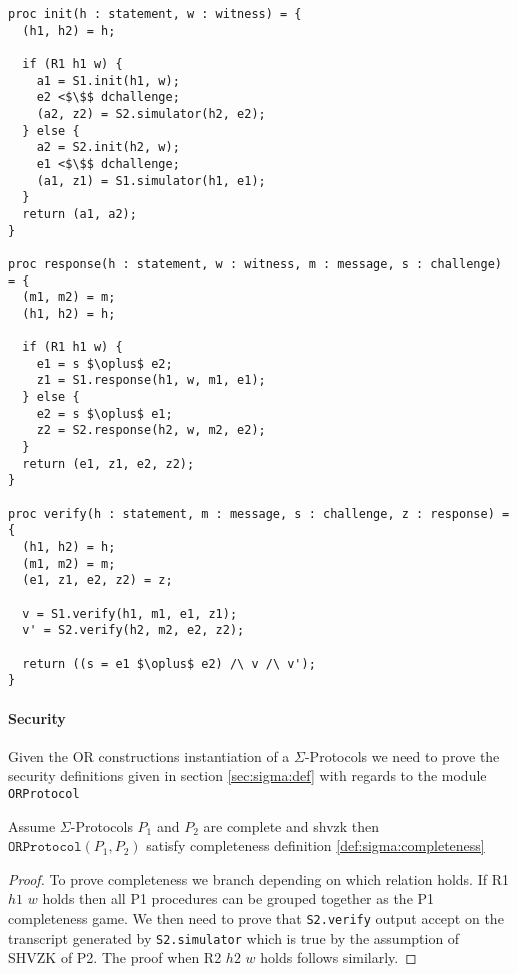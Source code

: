 \begin{lstlisting}[float, mathescape, label=lst:sigma:or,caption=OR construction]
proc init(h : statement, w : witness) = {
  (h1, h2) = h;

  if (R1 h1 w) {
    a1 = S1.init(h1, w);
    e2 <$\$$ dchallenge;
    (a2, z2) = S2.simulator(h2, e2);
  } else {
    a2 = S2.init(h2, w);
    e1 <$\$$ dchallenge;
    (a1, z1) = S1.simulator(h1, e1);
  }
  return (a1, a2);
}

proc response(h : statement, w : witness, m : message, s : challenge) = {
  (m1, m2) = m;
  (h1, h2) = h;

  if (R1 h1 w) {
    e1 = s $\oplus$ e2;
    z1 = S1.response(h1, w, m1, e1);
  } else {
    e2 = s $\oplus$ e1;
    z2 = S2.response(h2, w, m2, e2);
  }
  return (e1, z1, e2, z2);
}

proc verify(h : statement, m : message, s : challenge, z : response) = {
  (h1, h2) = h;
  (m1, m2) = m;
  (e1, z1, e2, z2) = z;

  v = S1.verify(h1, m1, e1, z1);
  v' = S2.verify(h2, m2, e2, z2);

  return ((s = e1 $\oplus$ e2) /\ v /\ v');
}
\end{lstlisting}


\paragraph{Security}
Given the OR constructions instantiation of a $\Sigma$-Protocols we need
to prove the security definitions given in section \ref{sec:sigma:def} with
regards to the module \texttt{ORProtocol}

\begin{lemma}[OR Completeness]
  Assume $\Sigma$-Protocols $P_{1}$ and $P_{2}$ are complete and shvzk then
  $\texttt{ORProtocol}(P_1, P_2)$ satisfy completeness definition \ref{def:sigma:completeness}
\end{lemma}
\begin{proof}
  To prove completeness we branch depending on which relation holds. If R1 $h1$
  $w$ holds then all P1 procedures can be grouped together as the P1
  completeness game. We then need to prove that \texttt{S2.verify} output accept
  on the transcript generated by \texttt{S2.simulator} which is true by the
  assumption of SHVZK of P2.
  The proof when R2 $h2$ $w$ holds follows similarly.
\end{proof}

